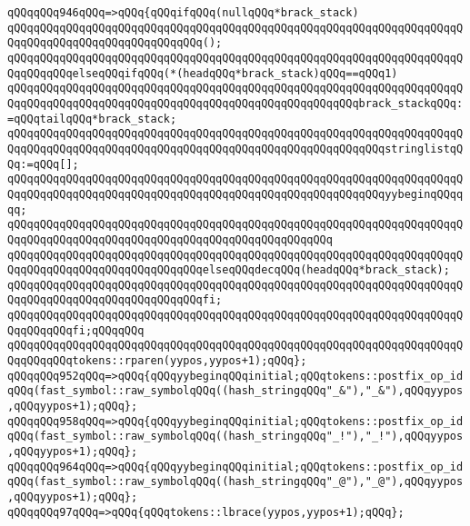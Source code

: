 \verb|qQQqqQQq946qQQq=>qQQq{qQQqifqQQq(nullqQQq*brack_stack)|\newline
\verb|qQQqqQQqqQQqqQQqqQQqqQQqqQQqqQQqqQQqqQQqqQQqqQQqqQQqqQQqqQQqqQQqqQQqqQQqqQQqqQQqqQQqqQQqqQQqqQQqqQQq();|\newline
\verb|qQQqqQQqqQQqqQQqqQQqqQQqqQQqqQQqqQQqqQQqqQQqqQQqqQQqqQQqqQQqqQQqqQQqqQQqqQQqqQQqelseqQQqifqQQq(*(headqQQq*brack_stack)qQQq==qQQq1)|\newline
\verb|qQQqqQQqqQQqqQQqqQQqqQQqqQQqqQQqqQQqqQQqqQQqqQQqqQQqqQQqqQQqqQQqqQQqqQQqqQQqqQQqqQQqqQQqqQQqqQQqqQQqqQQqqQQqqQQqqQQqqQQqqQQqbrack_stackqQQq:=qQQqtailqQQq*brack_stack;|\newline
\verb|qQQqqQQqqQQqqQQqqQQqqQQqqQQqqQQqqQQqqQQqqQQqqQQqqQQqqQQqqQQqqQQqqQQqqQQqqQQqqQQqqQQqqQQqqQQqqQQqqQQqqQQqqQQqqQQqqQQqqQQqqQQqqQQqstringlistqQQq:=qQQq[];|\newline
\verb|qQQqqQQqqQQqqQQqqQQqqQQqqQQqqQQqqQQqqQQqqQQqqQQqqQQqqQQqqQQqqQQqqQQqqQQqqQQqqQQqqQQqqQQqqQQqqQQqqQQqqQQqqQQqqQQqqQQqqQQqqQQqqQQqyybeginqQQqqqq;|\newline
\verb|qQQqqQQqqQQqqQQqqQQqqQQqqQQqqQQqqQQqqQQqqQQqqQQqqQQqqQQqqQQqqQQqqQQqqQQqqQQqqQQqqQQqqQQqqQQqqQQqqQQqqQQqqQQqqQQqqQQqqQQq|\newline
\verb|qQQqqQQqqQQqqQQqqQQqqQQqqQQqqQQqqQQqqQQqqQQqqQQqqQQqqQQqqQQqqQQqqQQqqQQqqQQqqQQqqQQqqQQqqQQqqQQqqQQqelseqQQqdecqQQq(headqQQq*brack_stack);|\newline
\verb|qQQqqQQqqQQqqQQqqQQqqQQqqQQqqQQqqQQqqQQqqQQqqQQqqQQqqQQqqQQqqQQqqQQqqQQqqQQqqQQqqQQqqQQqqQQqqQQqqQQqfi;|\newline
\verb|qQQqqQQqqQQqqQQqqQQqqQQqqQQqqQQqqQQqqQQqqQQqqQQqqQQqqQQqqQQqqQQqqQQqqQQqqQQqqQQqfi;qQQqqQQq|\newline
\verb|qQQqqQQqqQQqqQQqqQQqqQQqqQQqqQQqqQQqqQQqqQQqqQQqqQQqqQQqqQQqqQQqqQQqqQQqqQQqqQQqtokens::rparen(yypos,yypos+1);qQQq};|\newline
\verb|qQQqqQQq952qQQq=>qQQq{qQQqyybeginqQQqinitial;qQQqtokens::postfix_op_idqQQq(fast_symbol::raw_symbolqQQq((hash_stringqQQq"_&"),"_&"),qQQqyypos,qQQqyypos+1);qQQq};|\newline
\verb|qQQqqQQq958qQQq=>qQQq{qQQqyybeginqQQqinitial;qQQqtokens::postfix_op_idqQQq(fast_symbol::raw_symbolqQQq((hash_stringqQQq"_!"),"_!"),qQQqyypos,qQQqyypos+1);qQQq};|\newline
\verb|qQQqqQQq964qQQq=>qQQq{qQQqyybeginqQQqinitial;qQQqtokens::postfix_op_idqQQq(fast_symbol::raw_symbolqQQq((hash_stringqQQq"_@"),"_@"),qQQqyypos,qQQqyypos+1);qQQq};|\newline
\verb|qQQqqQQq97qQQq=>qQQq{qQQqtokens::lbrace(yypos,yypos+1);qQQq};|\newline
